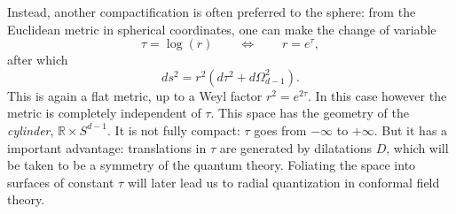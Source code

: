 \documentclass[a4paper,12pt]{article}
\numberwithin{equation}{section}
\begin{document}
Instead, another compactification is often preferred to the sphere: from the Euclidean metric in spherical coordinates, one can make the change of variable
\begin{equation}
	\tau = \log(r)
	\qquad\Leftrightarrow\qquad
	r = e^\tau,
\end{equation}
after which
\begin{equation}
	ds^2 = r^2 \left( d\tau^2 + d\Omega_{d-1}^2 \right).
	\label{eq:cylindercoordinates}
\end{equation}
This is again a flat metric, up to a Weyl factor $r^2 = e^{2\tau}$. In this case however the metric is completely independent of $\tau$.
This space has the geometry of the \emph{cylinder}, $\mathbb{R} \times S^{d-1}$. It is not fully compact: $\tau$ goes from $-\infty$ to $+\infty$. But it has a important advantage: translations in $\tau$ are generated by dilatations $D$, which will be taken to be a symmetry of the quantum theory. Foliating the space into surfaces of constant $\tau$ will later lead us to radial quantization in conformal field theory.
\end{document}
